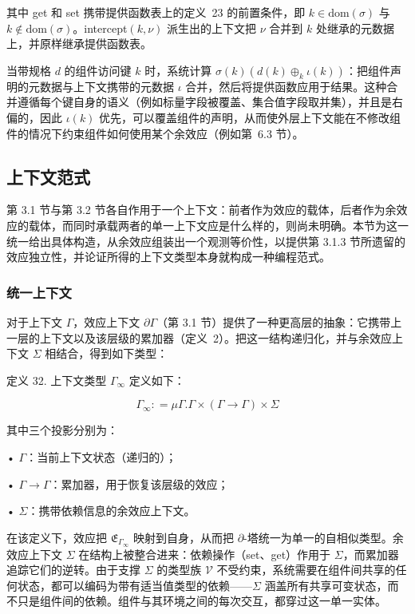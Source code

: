 \documentclass[
  10
]{article}
\begin{document}
其中 get 和 set 携带提供函数表上的定义~23 的前置条件，即 \(k \in \mathrm { d o m } ( \sigma )\) 与 \(k \notin \mathrm { d o m } ( \sigma )\)。intercept\(( k , \nu )\) 派生出的上下文把 \(\nu\) 合并到 \(k\) 处继承的元数据上，并原样继承提供函数表。

当带规格 \(d\) 的组件访问键 \(k\) 时，系统计算 \(\sigma ( k ) ( d ( k ) \oplus _ { k } \iota ( k ) )\)：把组件声明的元数据与上下文携带的元数据 \(\iota\) 合并，然后将提供函数应用于结果。这种合并遵循每个键自身的语义（例如标量字段被覆盖、集合值字段取并集），并且是右偏的，因此 \(\iota ( k )\) 优先，可以覆盖组件的声明，从而使外层上下文能在不修改组件的情况下约束组件如何使用某个余效应（例如第~6.3 节）。
\subsection{上下文范式} \label{the-context-paradigm}

第 3.1 节与第 3.2 节各自作用于一个上下文：前者作为效应的载体，后者作为余效应的载体，而同时承载两者的单一上下文应是什么样的，则尚未明确。本节为这一统一给出具体构造，从余效应组装出一个观测等价性，以提供第 3.1.3 节所遗留的效应独立性，并论证所得的上下文类型本身就构成一种编程范式。

\subsubsection{统一上下文} \label{unified-context}

对于上下文 $\Gamma$，效应上下文 $\partial \Gamma$（第 3.1 节）提供了一种更高层的抽象：它携带上一层的上下文以及该层级的累加器（定义~2）。把这一结构递归化，并与余效应上下文 $\Sigma$ 相结合，得到如下类型：

定义 32. 上下文类型 \(\Gamma _ { \infty }\) 定义如下：

\[
\Gamma _ { \infty } : = \mu \Gamma . \Gamma \times ( \Gamma \to \Gamma ) \times \Sigma\tag{31}
\]

其中三个投影分别为：

• \(\Gamma\)：当前上下文状态（递归的）；

• \(\Gamma \to \Gamma\)：累加器，用于恢复该层级的效应；

• \(\Sigma\)：携带依赖信息的余效应上下文。

在该定义下，效应把 \(\mathfrak { E } _ { \Gamma _ { \infty } }\) 映射到自身，从而把 $\partial$-塔统一为单一的自相似类型。余效应上下文 $\Sigma$ 在结构上被整合进来：依赖操作（set、get）作用于 $\Sigma$，而累加器追踪它们的逆转。由于支撑 $\Sigma$ 的类型族 $\mathcal{V}$ 不受约束，系统需要在组件间共享的任何状态，都可以编码为带有适当值类型的依赖——$\Sigma$ 涵盖所有共享可变状态，而不只是组件间的依赖。组件与其环境之间的每次交互，都穿过这一单一实体。
\end{document}
